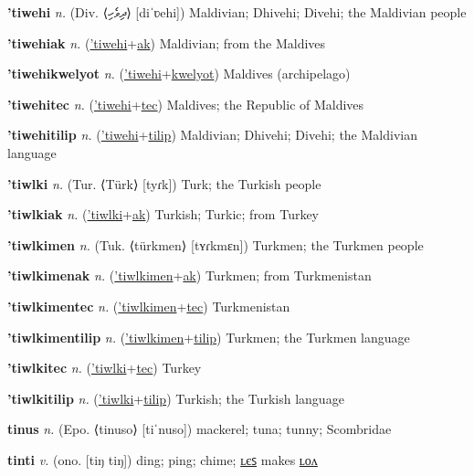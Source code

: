 \textbf{\hypertarget{'tiwehi}{'tiwehi}} \textit{n.} (Div. ⟨{\thaana{}ދިވެހި}⟩ [diˈʋehi])
Maldivian; Dhivehi; Divehi; the Maldivian people

\textbf{\hypertarget{'tiwehiak}{'tiwehiak}} \textit{n.} (\hyperlink{'tiwehi}{'tiwehi}+\allowbreak \hyperlink{ak}{ak})
Maldivian; from the Maldives

\textbf{\hypertarget{'tiwehikwelyot}{'tiwehikwelyot}} \textit{n.} (\hyperlink{'tiwehi}{'tiwehi}+\allowbreak \hyperlink{kwelyot}{kwelyot})
Maldives (archipelago)

\textbf{\hypertarget{'tiwehitec}{'tiwehitec}} \textit{n.} (\hyperlink{'tiwehi}{'tiwehi}+\allowbreak \hyperlink{tec}{tec})
Maldives; the Republic of Maldives

\textbf{\hypertarget{'tiwehitilip}{'tiwehitilip}} \textit{n.} (\hyperlink{'tiwehi}{'tiwehi}+\allowbreak \hyperlink{tilip}{tilip})
Maldivian; Dhivehi; Divehi; the Maldivian language

\textbf{\hypertarget{'tiwlki}{'tiwlki}} \textit{n.} (Tur. ⟨Türk⟩ [tyɾk])
Turk; the Turkish people

\textbf{\hypertarget{'tiwlkiak}{'tiwlkiak}} \textit{n.} (\hyperlink{'tiwlki}{'tiwlki}+\allowbreak \hyperlink{ak}{ak})
Turkish; Turkic; from Turkey

\textbf{\hypertarget{'tiwlkimen}{'tiwlkimen}} \textit{n.} (Tuk. ⟨türkmen⟩ [tʏɾkmɛn])
Turkmen; the Turkmen people

\textbf{\hypertarget{'tiwlkimenak}{'tiwlkimenak}} \textit{n.} (\hyperlink{'tiwlkimen}{'tiwlkimen}+\allowbreak \hyperlink{ak}{ak})
Turkmen; from Turkmenistan

\textbf{\hypertarget{'tiwlkimentec}{'tiwlkimentec}} \textit{n.} (\hyperlink{'tiwlkimen}{'tiwlkimen}+\allowbreak \hyperlink{tec}{tec})
Turkmenistan

\textbf{\hypertarget{'tiwlkimentilip}{'tiwlkimentilip}} \textit{n.} (\hyperlink{'tiwlkimen}{'tiwlkimen}+\allowbreak \hyperlink{tilip}{tilip})
Turkmen; the Turkmen language

\textbf{\hypertarget{'tiwlkitec}{'tiwlkitec}} \textit{n.} (\hyperlink{'tiwlki}{'tiwlki}+\allowbreak \hyperlink{tec}{tec})
Turkey

\textbf{\hypertarget{'tiwlkitilip}{'tiwlkitilip}} \textit{n.} (\hyperlink{'tiwlki}{'tiwlki}+\allowbreak \hyperlink{tilip}{tilip})
Turkish; the Turkish language

\textbf{\hypertarget{tinus}{tinus}} \textit{n.} (Epo. ⟨tinuso⟩ [tiˈnuso])
mackerel; tuna; tunny; Scombridae

\textbf{\hypertarget{tinti}{tinti}} \textit{v.} (ono. [tiŋ tiŋ])
ding; ping; chime; \hyperlink{tintiles}{ʟєꜱ} makes \hyperlink{tintilon}{ʟᴏᴧ}

